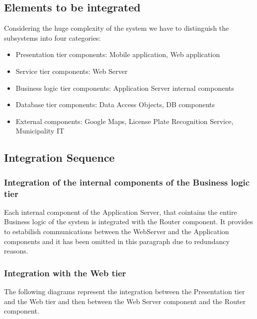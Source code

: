\documentclass[../DD.tex]{subfiles}
\begin{document}
\subsection{Elements to be integrated}
Considering the huge complexity of the system we have to distinguish the subsystems into four categories:
\begin{itemize}
	\item{Presentation tier components:} Mobile application, Web application
	\item{Service tier components:} Web Server
	\item{Business logic tier components:} Application Server internal components
	\item{Database tier components:} Data Access Objects, DB components
	\item{External components}: Google Maps, License Plate Recognition Service, Municipality IT
\end{itemize}

\subsection{Integration Sequence}
\subsubsection{Integration of the internal components of the Business logic tier}
Each internal component of the Application Server, that cointains the entire Business logic of the system is integrated with the Router component. It provides to estabilish communications between the WebServer and the Application components and it has been omitted in this paragraph due to redundancy reasons.


\subsubsection{Integration with the Web tier}
The following diagrams represent the integration between the Presentation tier and the Web tier and then between the Web Server component and the Router component.

\end{document}
